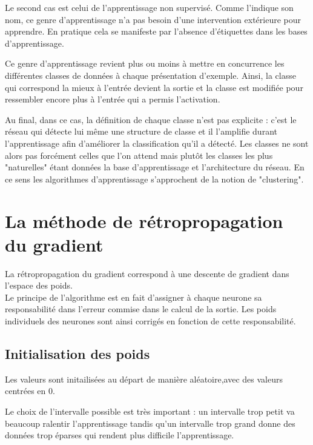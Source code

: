 \documentclass[a4paper,oneside]{report}
\begin{document}
                Le second cas est celui de l'apprentissage non supervisé. Comme l'indique son nom, ce 
genre d'apprentissage n'a pas besoin d'une intervention extérieure pour apprendre. En 
pratique cela se manifeste 
par l'absence d'étiquettes dans les bases d'apprentissage.

                Ce genre d'apprentissage revient plus ou moins à mettre en concurrence les différentes 
classes de données à chaque présentation d'exemple. Ainsi, la classe qui correspond la 
mieux à l'entrée devient 
la sortie et la classe est modifiée pour ressembler encore plus à l'entrée qui a permis l'activation.

                Au final, dans ce cas, la définition de chaque classe n'est pas explicite : c'est le 
réseau qui détecte lui même une structure de classe et il l'amplifie durant 
l'apprentissage afin d'améliorer la 
classification qu'il a détecté. Les classes ne sont alors pas forcément celles que l'on attend mais 
plutôt les classes les plus "naturelles" étant données la base d'apprentissage et l'architecture du 
réseau. En ce sens les algorithmes d'apprentissage s'approchent de la notion de "clustering".


            \section{La méthode de rétropropagation du gradient}

                La rétropropagation du gradient correspond à une descente de gradient dans l'espace 
des poids.\\

                Le principe de l'algorithme est en fait d'assigner à chaque neurone sa responsabilité 
dans l'erreur commise dans le calcul de la sortie. Les poids individuels des neurones 
sont ainsi corrigés en 
fonction de cette responsabilité.


                \subsection{Initialisation des poids}

                    Les valeurs sont initailisées au départ de manière aléatoire,avec des valeurs 
centrées en 0.

                    Le choix de l'intervalle possible est très important : un intervalle trop petit va 
beaucoup ralentir l'apprentissage tandis qu'un intervalle trop grand donne des 
données trop éparses qui rendent 
plus difficile l'apprentissage.
\end{document}
